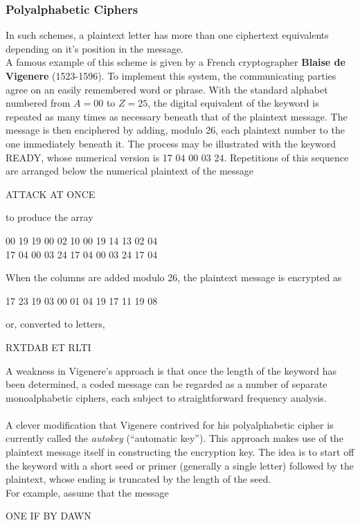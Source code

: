 \documentclass{article}
\begin{document}
\subsubsection{Polyalphabetic Ciphers}
In such schemes, a plaintext letter has more than one ciphertext equivalents depending on it's position in the message.\\
A famous example of this scheme is given by a French cryptographer {\bf Blaise de Vigenere} (1523-1596). To implement this system, the communicating parties agree on an easily remembered word or phrase. With the standard alphabet numbered from $A = 00$ to $Z = 25$, the digital equivalent of the keyword is repeated as many times as necessary beneath that of the plaintext message. The message is then enciphered by adding, modulo 26, each plaintext number to the one immediately beneath it. The process may be illustrated with the keyword READY, whose numerical version is 17 04 00 03 24. Repetitions of this sequence are arranged below the numerical plaintext of the message
\begin{center}
    ATTACK AT ONCE
\end{center}
to produce the array
\begin{center}
    00 19 19 00 02 10 00 19 14 13 02 04\\
    17 04 00 03 24 17 04 00 03 24 17 04
\end{center}
When the columns are added modulo 26, the plaintext message is encrypted as
\begin{center}
    17 23 19 03 00 01 04 19 17 11 19 08
\end{center}
or, converted to letters,
\begin{center}
    RXTDAB ET RLTI
\end{center}
A weakness in Vigenere's approach is that once the length of the keyword has been determined, a coded message can be regarded as a number of separate monoalphabetic ciphers, each subject to straightforward frequency analysis.\\ \\
A clever modification that Vigenere contrived for his polyalphabetic cipher is currently called the {\it autokey} (“automatic key”). This approach makes use of the plaintext message itself in constructing the encryption key. The idea is to start off the keyword with a short seed or primer (generally a single letter) followed by the plaintext, whose ending is truncated by the length of the seed.\\
For example, assume that the message
\begin{center}
    ONE IF BY DAWN
\end{center}
\end{document}

